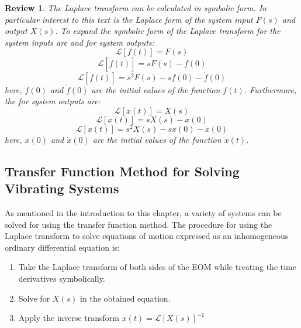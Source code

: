 \documentclass[12pt,letter]{article}
\numberwithin{ex}{section} %
\newtheorem{re}{Review}
\numberwithin{re}{section} %
\newenvironment{review}{\begin{mdframed}[middlelinewidth=2mm,roundcorner=20pt]\begin{re}\normalfont}{\end{re}\end{mdframed}}
\newcommand{\Laplace}[1]{\ensuremath{\mathcal{L}{\left[#1\right]}}}
\numberwithin{equation}{section}	%
\begin{document}
\begin{review}
			The Laplace transform can be calculated in symbolic form. In particular interest to this text is the Laplace form of the system input $F(s)$ and output $X(s)$. To expand the symbolic form of the Laplace transform for the system inputs are 
			and for system outputs:
			\begin{equation}
				\label{eq:laplace_f}
				\Laplace{f(t)} = F(s)
			\end{equation}		
			\begin{equation}
				\label{eq:laplace_f'}
				\Laplace{\dot{f}(t)} = sF(s)-f(0)
			\end{equation}	
			\begin{equation}
				\label{eq:laplace_f''}
				\Laplace{\ddot{f}(t)} = s^2F(s)-sf(0) - \dot{f}(0)
			\end{equation}	
			here, $f(0)$ and $\dot{f}(0)$ are the initial values of the function $f(t)$.  Furthermore, the for system outputs are:
			\begin{equation}
				\label{eq:laplace_x}
				\Laplace{x(t)} = X(s)
			\end{equation}		
			\begin{equation}
				\label{eq:laplace_x'}
				\Laplace{\dot{x}(t)} = sX(s)-x(0)
			\end{equation}	
			\begin{equation}
				\label{eq:laplace_x''}
				\Laplace{\ddot{x}(t)} = s^2X(s)-sx(0) - \dot{x}(0)
			\end{equation}	
			here, $x(0)$ and $\dot{x}(0)$ are the initial values of the function $x(t)$. 		
	
\end{review}


		\subsection{Transfer Function Method for Solving Vibrating Systems}
		
			As mentioned in the introduction to this chapter, a variety of systems can be solved for using the transfer function method. The procedure for using the Laplace transform to solve equations of motion expressed as an inhomogeneous ordinary differential equation is:
			\begin{enumerate}
				\item Take the Laplace transform of both sides of the EOM while treating the time derivatives symbolically.
				\item Solve for $X(s)$ in the obtained equation.
				\item Apply the inverse transform $x(t) = \Laplace{X(s)}^{-1}$
			\end{enumerate}
				
\end{document}
